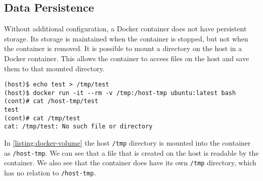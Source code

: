 \subsection{Data Persistence}\label{subsection:data-persistence}
Without additional configuration, a Docker container does not have persistent storage. Its storage is maintained when the container is stopped, but not when the container is removed. It is possible to mount a directory on the host in a Docker container. This allows the container to access files on the host and save them to that mounted directory.

\begin{lstlisting}[caption={Bind mount example.},label={listing:docker-volume},captionpos=b]
(host)$ echo test > /tmp/test
(host)$ docker run -it --rm -v /tmp:/host-tmp ubuntu:latest bash
(cont)# cat /host-tmp/test
test
(cont)# cat /tmp/test
cat: /tmp/test: No such file or directory
\end{lstlisting}

In \autoref{listing:docker-volume} the host \lstinline{/tmp} directory is mounted into the container as \lstinline{/host-tmp}. We can see that a file that is created on the host is readable by the container. We also see that the container does have its own \lstinline{/tmp} directory, which has no relation to \lstinline{/host-tmp}.
